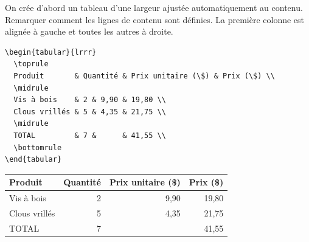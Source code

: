 \begin{exemple}
  \label{exemple:tableaux:tabular}
  On crée d'abord un tableau d'une largeur ajustée automatiquement au
  contenu. Remarquer comment les lignes de contenu sont définies. La
  première colonne est alignée à gauche et toutes les autres à droite.
\begin{lstlisting}
\begin{tabular}{lrrr}
  \toprule
  Produit       & Quantité & Prix unitaire (\$) & Prix (\$) \\
  \midrule
  Vis à bois    & 2 & 9,90 & 19,80 \\
  Clous vrillés & 5 & 4,35 & 21,75 \\
  \midrule
  TOTAL         & 7 &      & 41,55 \\
  \bottomrule
\end{tabular}
\end{lstlisting}
  \begin{center}
    \begin{tabular}{lrrr}
      \toprule
      Produit & Quantité & Prix unitaire (\$) & Prix (\$) \\
      \midrule
      Vis à bois    & 2 & 9,90 & 19,80 \\
      Clous vrillés & 5 & 4,35 & 21,75 \\
      \midrule
      TOTAL         & 7 &      & 41,55 \\
      \bottomrule
    \end{tabular}
  \end{center}


\end{exemple}

